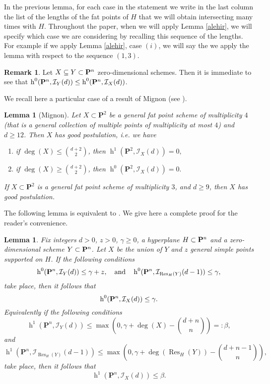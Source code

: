 \documentclass{amsart}
\theoremstyle{plain}
\newtheorem{lemma}[theorem]{Lemma}
\theoremstyle{definition}
\newtheorem{remark}[theorem]{Remark}
\begin{document}
In the previous lemma, for each case in the statement we write in the last column
the list of the lengths of the fat points of $H$ that we will obtain
intersecting many times with $H$.
Throughout the paper, when we will apply Lemma \ref{alehir}, we will
specify which case we are considering by recalling this sequence of the
lengths.
For example if we apply Lemma \ref{alehir}, case $(i)$, we
will say the we apply the lemma with respect to the sequence $(1,3)$.

\begin{remark}\label{facile}
Let $X \subseteq Y \subset {\bf {P}}^n$ zero-dimensional schemes.
Then it is immediate to see that $\operatorname{h}^0({\bf {P}}^n,\mathcal {I}_Y(d)) \le \operatorname{h}^0({\bf
  {P}}^n,\mathcal {I}_X(d))$.
\end{remark}

We recall here a particular case of a result of Mignon
(see \cite[Theorem 1]{m}).
\begin{lemma}[Mignon]
\label{mignon} Let $X\subset {\mathbf P}^2$ be a general fat point scheme of
multiplicity $4$ (that is a general collection of multiple points of
multiplicity at most $4$) and $d\ge 12$. Then $X$ has good postulation, i.e. we have
\begin{enumerate}
\item[(a)]
if $\deg(X) \le \binom{d+2}{2}$, then
$\operatorname{h}^1({\mathbf P}^2,\mathcal{I}_{X}(d))=0,$
\item[(b)] if $\deg(X) \ge\binom{d+2}{2}$, then
$\operatorname{h}^0({\mathbf P}^2,\mathcal {I}_{X}(d))=0.$
\end{enumerate}
If $X\subset {\mathbf P}^2$ is a general fat point scheme of
multiplicity $3$, and $d\ge9$, then $X$ has good postulation.
\end{lemma}

The following lemma is equivalent to \cite[Remark 2]{ballico-tripli}.
We give here a complete proof for the reader's convenience.
\begin{lemma}\label{remark2}
Fix integers $d>0$, $z>0$, $\gamma\ge0$,  a hyperplane $H\subset {\bf {P}}^n$
and a zero-dimensional scheme $Y\subset {\bf {P}}^n$.
Let $X$ be the union of $Y$ and $z$ general simple points supported on $H$.
If the following conditions
\begin{equation}\label{G}
\operatorname{h}^0({\bf {P}}^n,{\mathcal{I}}_Y(d))\le\gamma+z, \quad\mbox{and}
\quad \operatorname{h}^0({\bf {P}}^n,{\mathcal{I}}_{\operatorname{Res}_H(Y) }(d-1))\le\gamma,
\end{equation}
take place, then it follows that
$$
\operatorname{h}^0({\bf {P}}^n,{\mathcal{I}}_X(d))\le\gamma.
$$
Equivalently if the following conditions
$$\operatorname{h}^1({\mathbf P}^n,{\mathcal{I}}_Y(d))\le \max(0,\gamma+\deg(X)-\binom{d+n}{n})=:\beta,$$
and
$$\operatorname{h}^1({\mathbf P}^n,{\mathcal{I}}_{\operatorname{Res}_H(Y)}(d-1))\le
\max(0,\gamma+\deg(\operatorname{Res}_H(Y))-\binom{d+n-1}{n}),$$
take place, then it follows that
$$
\operatorname{h}^1({\mathbf P}^n,{\mathcal{I}}_X(d))\le \beta.
$$
\end{lemma}
\end{document}
